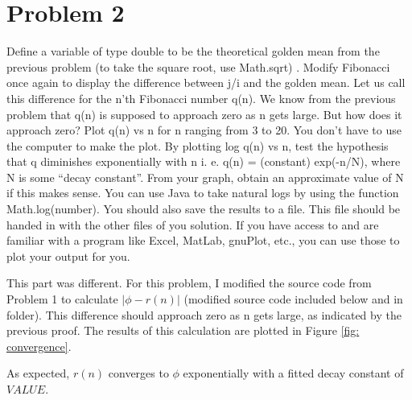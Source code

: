\documentclass[aps,letterpaper,10pt]{article}
\begin{document}
\newpage
\section{Problem 2}
\begin{center}
\begin{minipage}[h]{.85\linewidth}
Define a variable of type double to be the theoretical golden mean from the previous problem (to take the square root, use Math.sqrt) . Modify Fibonacci once again to display the difference between j/i and the golden mean.  Let us call this difference for the n'th Fibonacci number q(n).  We know from the previous problem that q(n) is supposed to approach zero as n gets large.  But how does it approach zero?  Plot q(n) vs n for n ranging from 3 to 20.  You don't have to use the computer to make the plot.  By plotting log q(n) vs n, test the hypothesis that q diminishes exponentially with n i. e. q(n) = (constant) exp(-n/N), where N is some ``decay constant''.  From your graph, obtain an approximate value of N if this makes sense.  You can use Java to take natural logs by using the function Math.log(number). 
You should also save the results to a file. This file should be handed in with the other files of you solution. If you have access to and are familiar with a program like Excel, MatLab, gnuPlot, etc., you can use those to plot your output for you.
\end{minipage}
\end{center}

This part was different.
For this problem, I modified the source code from Problem 1 to calculate $|\phi - r(n)|$ (modified source code included below and in folder). This difference should approach zero as n gets large, as indicated by the previous proof. The results of this calculation are plotted in Figure \ref{fig: convergence}. 


As expected, $r(n)$ converges to $\phi$ exponentially with a fitted decay constant of $VALUE$.



\newpage

\end{document}
